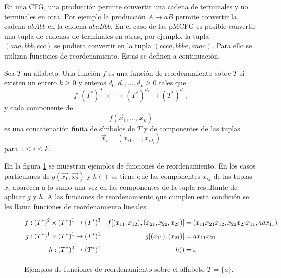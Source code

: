 En una CFG, una producción permite convertir una cadena de terminales y no terminales en otra. Por ejemplo la producción $A \to aB$ permite convertir la cadena $abAbb$ en la cadena $abaBbb$. En el caso de las pMCFG es posible convertir una tupla de cadenas de terminales en otras, por ejemplo, la tupla $(aaa, bbb, ccc)$ se pudiera convertir en la tupla $(ccca, bbba, aaac)$. Para ello se utilizan funciones de reordenamiento. Estas se definen a continuación.

\begin{definition}
    Sea $T$ un alfabeto. Una función $f$ es una función de reordenamiento sobre $T$ si existen un entero $k \geq 0$ y enteros $d_0, d_1, \ldots, d_k \geq 0$ tales que
    $$
        f : (T^*)^{d_1} \times \cdots \times (T^*)^{d_k}
        \to
        (T^*)^{d_0},
    $$
    y cada componente de
    $$
        f(\vec{x}_1, \ldots, \vec{x}_k)
    $$
    es una concatenación finita de símbolos de $T$ y de componentes de las tuplas
    $$
        \vec{x}_i = (x_{i1}, \ldots, x_{id_i})
    $$
    para $1 \leq i \leq k$.
\end{definition}

En la figura \ref{fig:reorder-fn} se muestran ejemplos de funciones de reordenamiento. En los casos particulares de $g(\vec{x_1}, \vec{x_2})$ y $h()$ se tiene que las componentes $x_{ij}$ de las tuplas $x_i$ aparecen a lo sumo una vez en las componentes de la tupla resultante de aplicar $g$ y $h$. A las funciones de reordenamiento que cumplen esta condición se les llama funciones de reordenamiento lineales.

\begin{figure}[h]
    \centering
    $$
        \begin{aligned}
            f : (T^*)^2 \times (T^*)^1                    & \to (T^*)^3
                                                          &
            f[(x_{11}, x_{12}), (x_{21}, x_{22}, x_{23})] & = (x_{11}x_{21}x_{12}, x_{22}x_{23}x_{11}, aax_{11})
            \\[0.4em]
            g : (T^*)^1 \times (T^*)^1
                                                          & \to (T^*)^1
                                                          &
            g[(x_{11}), (x_{21})]
                                                          & = ax_{11}x_{21}
            \\[0.4em]
            h : (T^*)^0
                                                          & \to (T^*)^1
                                                          &
            h()
                                                          & = \varepsilon
            \\[0.4em]
        \end{aligned}
    $$

    \caption{Ejemplos de funciones de reordenamiento sobre el alfabeto $T = \{a\}$.}
    \label{fig:reorder-fn}
\end{figure}



